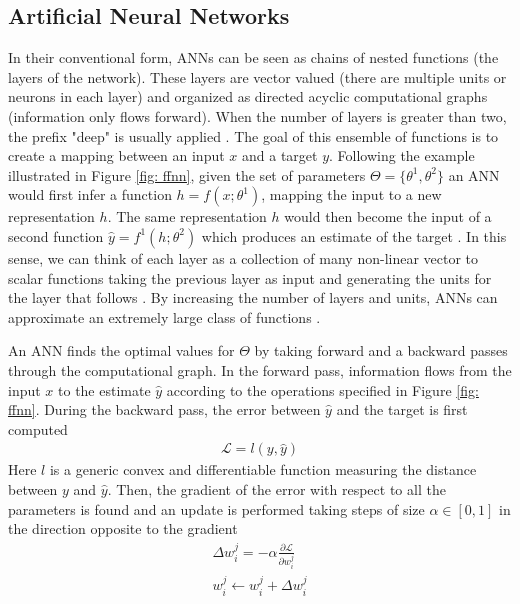 \subsection{Artificial Neural Networks}
\label{artificial_neural_networks}
In their conventional form, ANNs can be seen as chains of nested functions (the layers of the network). These layers are vector valued (there are multiple units or neurons in each layer) and organized as directed acyclic computational graphs (information only flows forward). When the number of layers is greater than two, the prefix "deep" is usually applied \cite{bengio2017deep}. The goal of this ensemble of functions is to create a mapping between an input $x$ and a target $y$. Following the example illustrated in Figure \ref{fig: ffnn}, given the set of parameters $\Theta = \{\theta^1, \theta^2 \}$ an ANN would first infer a function $h = f(x;\theta^{1})$, mapping the input to a new representation $h$. The same representation $h$ would then become the input of a second function $\widehat{y} = f^{1}(h;\theta^{2})$ which produces an estimate of the target \cite{bengio2017deep}. In this sense, we can think of each layer as a collection of many non-linear vector to scalar functions taking the previous layer as input and generating the units for the layer that follows \cite{bengio2017deep}. By increasing the number of layers and units, ANNs can approximate an extremely large class of functions \cite{rumelhart1986learning}.

An ANN finds the optimal values for $\Theta$ by taking forward and a backward passes through the computational graph. In the forward pass, information flows from the input $x$ to the estimate $\widehat{y}$ according to the operations specified in Figure \ref{fig: ffnn}. During the backward pass, the error between $\widehat{y}$ and the target is first computed
\begin{gather}
\label{loss}
    \mathcal{L} = l(y, \widehat{y})
\end{gather}
Here $l$ is a generic convex and differentiable function measuring the distance between $y$ and $\widehat{y}$. Then, the gradient of the error with respect to all the parameters is found and an update is performed taking steps of size $\alpha \in [0, 1]$ in the direction opposite to the gradient
\begin{gather}
\label{delta_rule}
    \Delta w^{j}_{i} = -\alpha\frac{\partial \mathcal{L}}{\partial w^{j}_{i}} \\
    w^{j}_{i} \leftarrow w^{j}_{i} + \Delta w^{j}_{i} \nonumber
\end{gather}
